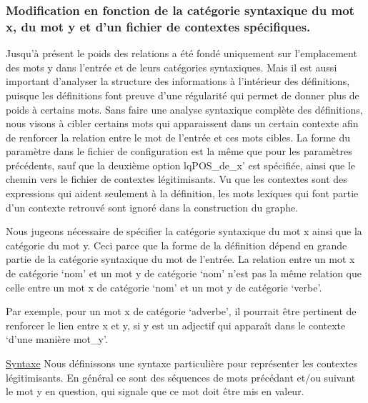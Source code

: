 \subsubsection{Modification en fonction de la catégorie syntaxique du mot x, du 
mot y et d'un fichier de contextes spécifiques.} 
Jusqu'à présent le poids des relations a été fondé uniquement sur l'emplacement 
des mots y dans l'entrée et de leurs catégories syntaxiques. Mais il est aussi 
important d'analyser la structure des informations à l'intérieur des 
définitions, puisque les définitions font preuve d'une régularité qui permet de 
donner plus de poids à certains mots. Sans faire une analyse syntaxique complète 
des définitions, nous visons à cibler certains mots qui apparaissent dans un 
certain contexte afin de renforcer la relation entre le mot de l'entrée et ces 
mots cibles. La forme du paramètre dans le fichier de configuration est la même 
que pour les paramètres précédents, sauf que la deuxième option 
lq{POS\_de\_x}\rq{} est spécifiée, ainsi que le chemin vers le fichier de 
contextes légitimisants. Vu que les contextes sont des expressions qui aident
seulement à la définition, les mots lexiques qui font partie d'un contexte
retrouvé sont ignoré dans la construction du graphe. 

Nous jugeons nécessaire de spécifier la catégorie syntaxique du mot x ainsi que 
la catégorie du mot y. Ceci parce que la forme de la définition dépend en grande 
partie de la catégorie syntaxique du mot de l'entrée. La relation entre un 
mot x de catégorie \lq{nom}\rq{} et un mot y de catégorie \lq{nom}\rq{} n'est pas la même 
relation que celle entre un mot x de catégorie \lq{nom}\rq{} et un mot y de 
catégorie \lq{verbe}\rq.

Par exemple, pour un mot x de catégorie \lq{adverbe}\rq, il pourrait être 
pertinent de renforcer le lien entre x et y, si y est un adjectif qui apparaît 
dans le contexte \lq{d'une manière mot\_y}\rq.

\underline{Syntaxe}\newline
Nous définissons une syntaxe particulière pour représenter les contextes 
légitimisants. En général ce sont des séquences de mots précédant et/ou suivant 
le mot y en question, qui signale que ce mot doit être mis en valeur.\newline

